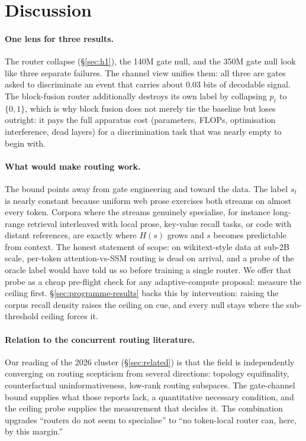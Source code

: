 \documentclass[11pt,a4paper]{article}
\begin{document}
\section{Discussion}
\label{sec:discussion}

\paragraph{One lens for three results.} The router collapse
(\S\ref{sec:h1}), the 140M gate null, and the 350M gate null look like
three separate failures. The channel view unifies them: all three are
gates asked to discriminate an event that carries about $0.03$ bits of
decodable signal. The block-fusion router additionally destroys its own
label by collapsing $p_\ell$ to $\{0,1\}$, which is why block fusion does
not merely tie the baseline but loses outright: it pays the full
apparatus cost (parameters, FLOPs, optimisation interference, dead
layers) for a discrimination task that was nearly empty to begin with.

\paragraph{What would make routing work.} The bound points away from
gate engineering and toward the data. The label $s_t$ is nearly constant
because uniform web prose exercises both streams on almost every token.
Corpora where the streams genuinely specialise, for instance long-range
retrieval interleaved with local prose, key-value recall tasks, or code
with distant references, are exactly where $H(s)$ grows and $s$ becomes
predictable from context. The honest statement of scope: on wikitext-style
data at sub-2B scale, per-token attention-vs-SSM routing is dead on
arrival, and a probe of the oracle label would have told us so before
training a single router. We offer that probe as a cheap pre-flight check
for any adaptive-compute proposal: measure the ceiling first.
\S\ref{sec:programme-results} backs this by intervention: raising the
corpus recall density raises the ceiling on cue, and every null stays
where the sub-threshold ceiling forces it.

\paragraph{Relation to the concurrent routing literature.} Our reading
of the 2026 cluster (\S\ref{sec:related}) is that the field is
independently converging on routing scepticism from several directions:
topology equifinality, counterfactual uninformativeness, low-rank routing
subspaces. The gate-channel bound supplies what those reports lack, a
quantitative necessary condition, and the ceiling probe supplies the
measurement that decides it. The combination upgrades ``routers do not
seem to specialise'' to ``no token-local router can, here, by this
margin.''
\end{document}
